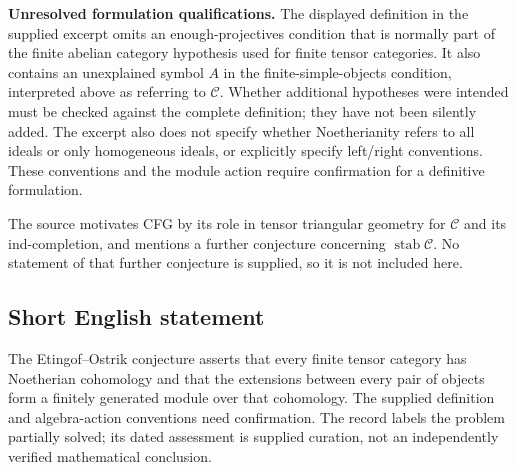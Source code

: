 \documentclass[11pt]{article}
\begin{document}
\textbf{Unresolved formulation qualifications.} The displayed definition in the supplied excerpt omits an enough-projectives condition that is normally part of the finite abelian category hypothesis used for finite tensor categories. It also contains an unexplained symbol \(A\) in the finite-simple-objects condition, interpreted above as referring to \(\mathcal C\). Whether additional hypotheses were intended must be checked against the complete definition; they have not been silently added. The excerpt also does not specify whether Noetherianity refers to all ideals or only homogeneous ideals, or explicitly specify left/right conventions. These conventions and the module action require confirmation for a definitive formulation.

The source motivates CFG by its role in tensor triangular geometry for \(\mathcal C\) and its ind-completion, and mentions a further conjecture concerning \(\operatorname{stab}\mathcal C\). No statement of that further conjecture is supplied, so it is not included here.
\subsection{Short English statement}
The Etingof--Ostrik conjecture asserts that every finite tensor category has Noetherian cohomology and that the extensions between every pair of objects form a finitely generated module over that cohomology. The supplied definition and algebra-action conventions need confirmation. The record labels the problem partially solved; its dated assessment is supplied curation, not an independently verified mathematical conclusion.
\end{document}
